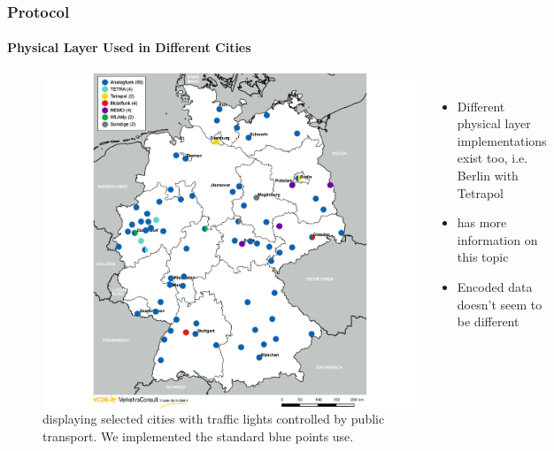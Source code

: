 
\begin{frame}
\frametitle{Protocol}
\framesubtitle{Physical Layer Used in Different Cities}
\begin{figure}
\begin{columns}
\centering
\includegraphics[height=0.8\textheight]{figs/vcdb-map-ampelbeeinflussung.png}
\caption{ displaying selected cities with traffic lights controlled by public transport. We implemented the standard blue points use.}
\begin{itemize}
	\item Different physical layer implementations exist too, i.e. Berlin with Tetrapol
	\item {} has more information on this topic
	\item Encoded data doesn't seem to be different
\end{itemize}
\end{columns}
\end{figure}
\end{frame}

